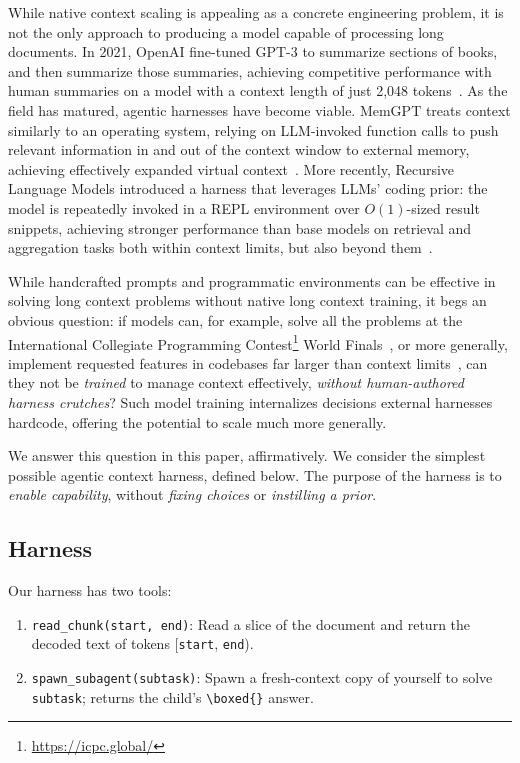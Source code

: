 While native context scaling is appealing as a concrete engineering problem, it is not the only approach to producing a model capable of processing long documents. In 2021, OpenAI fine-tuned GPT-3 to summarize sections of books, and then summarize those summaries, achieving competitive performance with human summaries on a model with a context length of just 2,048 tokens~\citep{wu2021recursive}. As the field has matured, agentic harnesses have become viable. MemGPT treats context similarly to an operating system, relying on LLM-invoked function calls to push relevant information in and out of the context window to external memory, achieving effectively expanded virtual context~\citep{packer2023memgpt}. More recently, Recursive Language Models introduced a harness that leverages LLMs' coding prior: the model is repeatedly invoked in a REPL environment over $O(1)$-sized result snippets, achieving stronger performance than base models on retrieval and aggregation tasks both within context limits, but also beyond them~\citep{zhang2025rlm}.

While handcrafted prompts and programmatic environments can be effective in solving long context problems without native long context training, it begs an obvious question: if models can, for example, solve all the problems at the International Collegiate Programming Contest\footnote{\url{https://icpc.global/}} World Finals~\citep{openai2025icpc}, or more generally, implement requested features in codebases far larger than context limits~\citep{marten2026terminalbench,openai2026gpt6astra,anthropic2026fablemythos51}, can they not be \emph{trained} to manage context effectively, \emph{without human-authored harness crutches}? Such model training internalizes decisions external harnesses hardcode, offering the potential to scale much more generally.

We answer this question in this paper, affirmatively. We consider the simplest possible agentic context harness, defined below. The purpose of the harness is to \emph{enable capability}, without \emph{fixing choices} or \emph{instilling a prior}.

\subsection{Harness}

Our harness has two tools:

\begin{enumerate}
  \item \verb|read_chunk(start, end)|: Read a slice of the document and return the decoded text of tokens [\verb|start|, \verb|end|).
  \item \verb|spawn_subagent(subtask)|: Spawn a fresh-context copy of yourself to solve \verb|subtask|; returns the child's \verb|\boxed{}| answer.
\end{enumerate}

